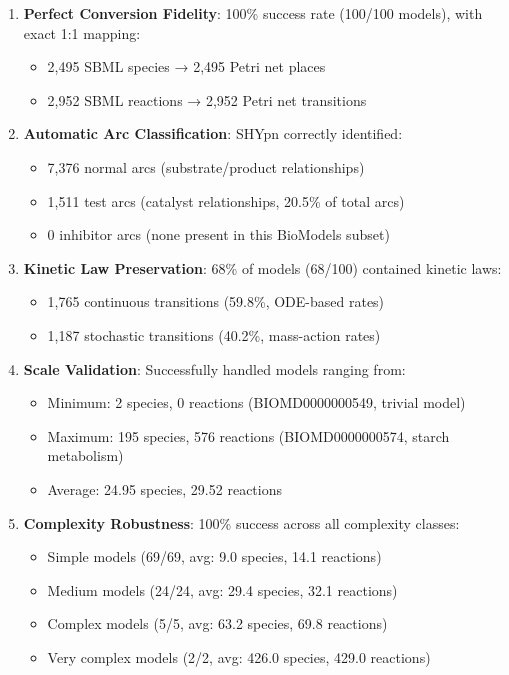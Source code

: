 \begin{enumerate}
\item \textbf{Perfect Conversion Fidelity}: 100\% success rate (100/100 models), with exact 1:1 mapping:
   \begin{itemize}
      \item 2,495 SBML species → 2,495 Petri net places
      \item 2,952 SBML reactions → 2,952 Petri net transitions
   \end{itemize}

\item \textbf{Automatic Arc Classification}: SHYpn correctly identified:
   \begin{itemize}
      \item 7,376 normal arcs (substrate/product relationships)
      \item 1,511 test arcs (catalyst relationships, 20.5\% of total arcs)
      \item 0 inhibitor arcs (none present in this BioModels subset)
   \end{itemize}

\item \textbf{Kinetic Law Preservation}: 68\% of models (68/100) contained kinetic laws:
   \begin{itemize}
      \item 1,765 continuous transitions (59.8\%, ODE-based rates)
      \item 1,187 stochastic transitions (40.2\%, mass-action rates)
   \end{itemize}

\item \textbf{Scale Validation}: Successfully handled models ranging from:
   \begin{itemize}
      \item Minimum: 2 species, 0 reactions (BIOMD0000000549, trivial model)
      \item Maximum: 195 species, 576 reactions (BIOMD0000000574, starch metabolism)
      \item Average: 24.95 species, 29.52 reactions
   \end{itemize}

\item \textbf{Complexity Robustness}: 100\% success across all complexity classes:
   \begin{itemize}
      \item Simple models (69/69, avg: 9.0 species, 14.1 reactions)
      \item Medium models (24/24, avg: 29.4 species, 32.1 reactions)
      \item Complex models (5/5, avg: 63.2 species, 69.8 reactions)
      \item Very complex models (2/2, avg: 426.0 species, 429.0 reactions)
   \end{itemize}
\end{enumerate}

